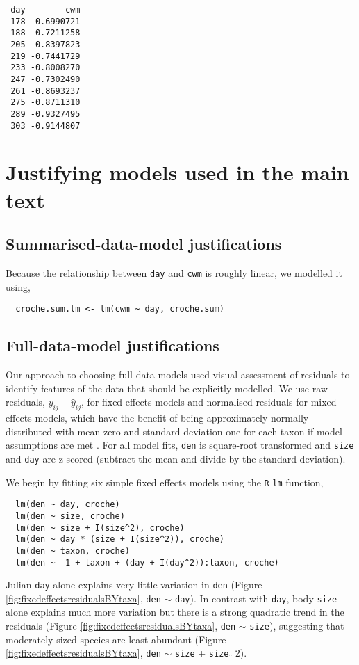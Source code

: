 \documentclass[12pt]{ecologyFORAPPENDIX}
\begin{document}
\vspace{-18pt}
\singlespace
\begin{verbatim}
 day        cwm
 178 -0.6990721
 188 -0.7211258
 205 -0.8397823
 219 -0.7441729
 233 -0.8008270
 247 -0.7302490
 261 -0.8693237
 275 -0.8711310
 289 -0.9327495
 303 -0.9144807
\end{verbatim}
\doublespace

\section{Justifying models used in the main text}

\subsection{Summarised-data-model justifications}

Because the relationship between \texttt{day} and \texttt{cwm} is roughly linear, we modelled it using,
\vspace{-18pt}
\singlespace
\begin{verbatim}
  croche.sum.lm <- lm(cwm ~ day, croche.sum)
\end{verbatim}
\doublespace

\subsection{Full-data-model justifications}

Our approach to choosing full-data-models used visual assessment of residuals to identify features of the data that should be explicitly modelled.  We use raw residuals, $y_{ij} - \hat{y}_{ij}$, for fixed effects models and normalised residuals for mixed-effects models, which have the benefit of being approximately normally distributed with mean zero and standard deviation one for each taxon if model assumptions are met \citep{PinheiroAndBates2000}.  For all model fits, \texttt{den} is square-root transformed and \texttt{size} and \texttt{day} are z-scored (subtract the mean and divide by the standard deviation).

We begin by fitting six simple fixed effects models using the \texttt{R} \texttt{lm} function,
\vspace{-18pt}
\singlespace
\begin{verbatim}
  lm(den ~ day, croche)
  lm(den ~ size, croche)
  lm(den ~ size + I(size^2), croche)
  lm(den ~ day * (size + I(size^2)), croche)
  lm(den ~ taxon, croche)
  lm(den ~ -1 + taxon + (day + I(day^2)):taxon, croche)
\end{verbatim}
\doublespace
Julian \texttt{day} alone explains very little variation in \texttt{den} (Figure \ref{fig:fixedeffectsresidualsBYtaxa}, \texttt{den} $\sim$ \texttt{day}).  In contrast with \texttt{day}, body \texttt{size} alone explains much more variation but there is a strong quadratic trend in the residuals (Figure \ref{fig:fixedeffectsresidualsBYtaxa}, \texttt{den} $\sim$ \texttt{size}), suggesting that moderately sized species are least abundant (Figure \ref{fig:fixedeffectsresidualsBYtaxa}, \texttt{den} $\sim$ \texttt{size} + \texttt{size} $\hat{}$ 2).
\end{document}
